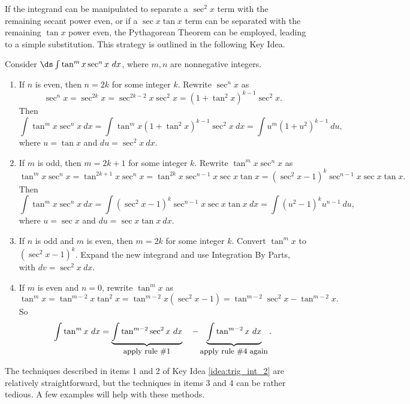 If the integrand can be manipulated to separate a $\sec^2x$ term with the remaining secant power even, or if a $\sec x\tan x$ term can be separated with the remaining $\tan x$ power even, the Pythagorean Theorem can be employed, leading to a simple substitution. This strategy is outlined in the following Key Idea.

\setboxwidth{130pt}
{Consider $\ds\int\tan^mx\sec^nx\ dx$, where $m,n$ are nonnegative integers.
\begin{enumerate}
\item		If $n$ is even, then $n=2k$ for some integer $k$. Rewrite $\sec^nx$ as 
$$\sec^nx = \sec^{2k}x = \sec^{2k-2}x\sec^2x = (1+\tan^2x)^{k-1}\sec^2x.$$
Then
$$\int\tan^mx\sec^nx\ dx=\int\tan^mx(1+\tan^2x)^{k-1}\sec^2x\ dx = \int u^m(1+u^2)^{k-1}\ du,$$
where $u = \tan x$ and $du = \sec^2x\ dx$.

\item		If $m$ is odd, then $m=2k+1$ for some integer $k$. Rewrite $\tan^mx\sec^nx$ as
$$\tan^mx\sec^nx = \tan^{2k+1}x\sec^nx = \tan^{2k}x\sec^{n-1}x\sec x\tan x = (\sec^2x-1)^k\sec^{n-1}x\sec x\tan x.$$
Then
$$\int\tan^mx\sec^nx\ dx=\int(\sec^2x-1)^k\sec^{n-1}x\sec x\tan x\ dx = \int(u^2-1)^ku^{n-1}\ du,$$
where $u = \sec x$ and $du = \sec x\tan x\ dx$.

\item If $n$ is odd and $m$ is even, then $m=2k$ for some integer $k$. Convert $\tan^mx $ to $(\sec^2x-1)^k$. Expand the new integrand and use Integration By Parts, with $dv = \sec^2x\ dx$.

\item		If $m$ is even and $n=0$, rewrite $\tan^mx$ as
$$\tan^mx = \tan^{m-2}x\tan^2x = \tan^{m-2}x(\sec^2x-1) = \tan^{m-2}\sec^2x-\tan^{m-2}x.$$
So
$$\int\tan^mx\ dx = \underbrace{\int\tan^{m-2}\sec^2x\ dx}_{\text{\small apply rule \#1}}\quad - \underbrace{\int\tan^{m-2}x\ dx}_{\text{\small apply rule \#4 again}}.$$

\end{enumerate}
}
\restoreboxwidth

The techniques described in items 1 and 2 of Key Idea \ref{idea:trig_int_2} are relatively straightforward, but the techniques in items 3 and 4 can be rather tedious. A few examples will help with these methods.\\

